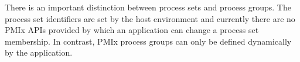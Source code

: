 There is an important distinction between process sets and process groups. The process set identifiers are set by the host environment and currently there are no PMIx APIs provided by which an application can change a process set membership. In contrast, PMIx process groups can only be defined dynamically by the application.


{\large {}}

{\large {}}





